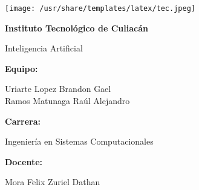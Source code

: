 \documentclass[14pt]{extarticle}
\begin{document}
  
  \thispagestyle{empty}

  \texttt{[image: /usr/share/templates/latex/tec.jpeg]}

  \begin{center}
    {\LARGE \textbf{Instituto Tecnológico de Culiacán}}

    \vspace{1cm}
    {\Large Inteligencia Artificial}

    \vspace{4cm}
    {\large \textbf{Equipo:}}

    \vspace{0.3cm}
    {\large
      Uriarte Lopez Brandon Gael\\\vspace{0.3cm}
      Ramos Matunaga Raúl Alejandro
    }

    \vspace{2cm}
    {\large \textbf{Carrera:}}

    \vspace{0.3cm}
    {\large Ingeniería en Sistemas Computacionales}

    \vspace{2cm}
    {\large \textbf{Docente:}}

    \vspace{0.3cm}
    {\large Mora Felix Zuriel Dathan}
  \end{center}

  \newpage
\end{document}
